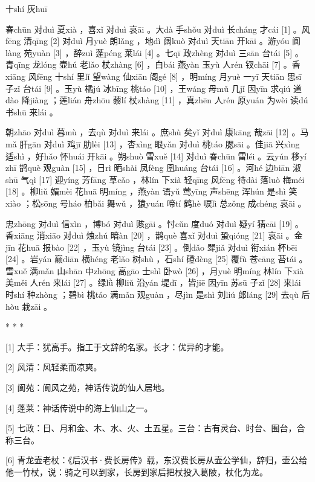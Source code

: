 \documentclass[12pt,UTF8]{ctexbook}
\begin{document}
十shí 灰huī


春chūn 对duì 夏xià ，喜xǐ 对duì 哀āi 。大dà 手shǒu 对duì 长cháng 才cái [1] 。风fēng 清qīng [2] 对duì 月yuè 朗lǎng ，地dì 阔kuò 对duì 天tiān 开kāi 。游yóu 阆làng 苑yuàn [3] ，醉zuì 蓬péng 莱lái [4] 。七qī 政zhèng 对duì 三sān 台tái [5] 。青qīng 龙lóng 壶hú 老lǎo 杖zhàng [6] ，白bái 燕yàn 玉yù 人rén 钗chāi [7] 。香xiāng 风fēng 十shí 里lǐ 望wàng 仙xiān 阁gé [8] ，明míng 月yuè 一yī 天tiān 思sī 子zǐ 台tái [9] 。玉yù 橘jú 冰bīng 桃táo [10] ，王wáng 母mǔ 几jǐ 因yīn 求qiú 道dào 降jiàng ；莲lián 舟zhōu 藜lí 杖zhàng [11] ，真zhēn 人rén 原yuán 为wèi 读dú 书shū 来lái 。

朝zhāo 对duì 暮mù ，去qù 对duì 来lái 。庶shù 矣yǐ 对duì 康kāng 哉zāi [12] 。马mǎ 肝gān 对duì 鸡jī 肋lèi [13] ，杏xìng 眼yǎn 对duì 桃táo 腮sāi 。佳jiā 兴xìng 适shì ，好hǎo 怀huái 开kāi 。朔shuò 雪xuě [14] 对duì 春chūn 雷léi 。云yún 移yí zhī 鹊què 观guàn [15] ，日rì 晒shài 凤fèng 凰huáng 台tái [16] 。河hé 边biān 淑shū 气qì [17] 迎yíng 芳fāng 草cǎo ，林lín 下xià 轻qīng 风fēng 待dài 落luò 梅méi [18] 。柳liǔ 媚mèi 花huā 明míng ，燕yàn 语yǔ 莺yīng 声shēng 浑hún 是shì 笑xiào ；松sōng 号háo 柏bǎi 舞wǔ ，猿yuán 啼tí 鹤hè 唳lì 总zǒng 成chéng 哀āi 。

忠zhōng 对duì 信xìn ，博bó 对duì 赅gāi 。忖cǔn 度duó 对duì 疑yí 猜cāi [19] 。香xiāng 消xiāo 对duì 烛zhú 暗àn [20] ，鹊què 喜xǐ 对duì 蛩qióng [21] 哀āi 。金jīn 花huā 报bào [22] ，玉yù 镜jìng 台tái [23] 。倒dǎo 斝jiǎ 对duì 衔xián 杯bēi [24] 。岩yán 巅diān 横héng 老lǎo 树shù ，石shí 磴dèng [25] 覆fù 苍cāng 苔tái 。雪xuě 满mǎn 山shān 中zhōng 高gāo 士shì 卧wò [26] ，月yuè 明míng 林lín 下xià 美měi 人rén 来lái [27] 。绿lǜ 柳liǔ 沿yán 堤dī ，皆jiē 因yīn 苏sū 子zǐ [28] 来lái 时shí 种zhòng ；碧bì 桃táo 满mǎn 观guàn ，尽jìn 是shì 刘liú 郎láng [29] 去qù 后hòu 栽zāi 。



* * *



[1] 大手：犹高手。指工于文辞的名家。长才：优异的才能。

[2] 风清：风轻柔而凉爽。

[3] 阆苑：阆风之苑，神话传说的仙人居地。

[4] 蓬莱：神话传说中的海上仙山之一。

[5] 七政：日、月和金、木、水、火、土五星。三台：古有灵台、时台、囿台，合称三台。

[6] 青龙壶老杖：《后汉书·费长房传》载，东汉费长房从壶公学仙，辞归，壶公给他一竹杖，说：骑之可以到家，长房到家后把杖投入葛陂，杖化为龙。
\end{document}
